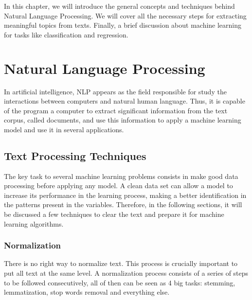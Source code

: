 In this chapter, we will introduce the general concepts and techniques behind Natural Language Processing. We will cover all the necessary steps for extracting meaningful topics from texts. Finally, a brief discussion about machine learning for tasks like classification and regression.


\section{Natural Language Processing}

	In artificial intelligence, NLP appears as the field responsible for study the interactions between computers and natural human language. Thus, it is capable of the program a computer to extract significant information from the text corpus, called documents, and use this information to apply a machine learning model and use it in several applications. 

	\subsection{Text Processing Techniques}\label{sec:text-processing}
	
	The key task to several machine learning problems consists in make good data processing before applying any model. A clean data set can allow a model to increase its performance in the learning process, making a better identification in the patterns present in the variables. Therefore, in the following sections, it will be discussed a few techniques to clear the text and prepare it for machine learning algorithms.
	
	\subsubsection{Normalization}
	
	There is no right way to normalize text. This process is crucially important to put all text at the same level. A normalization process consists of a series of steps to be followed consecutively, all of then can be seen as 4 big tasks: stemming, lemmatization, stop words removal and everything else.
	
